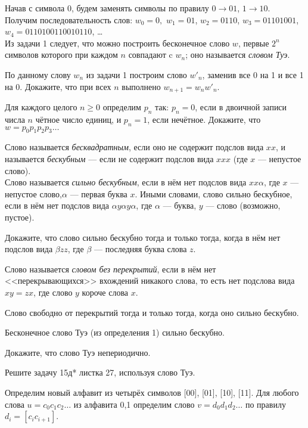 \documentclass[a4paper,12pt]{article}
\begin{document}


Начав с символа 0, будем заменять символы по правилу $0\rightarrow 01$,
$1\rightarrow10$. Получим последовательность слов:
$w_0=0,$ $w_1=01$, $w_2=0110$, $w_3=01101001$, $w_4=0110100110010110$, \ldots\\
Из задачи 1 следует, что можно построить бесконечное слово $w$, первые $2^n$ символов которого при каждом $n$ совпадают c $w_n$; оно называется {\em словом Туэ}.

По данному слову $w_n$ из задачи 1 построим слово $w'_n$, заменив все 0 на 1 и все 1 на 0.
Докажите, что при всех $n$ выполнено $w_{n+1}=w_nw'_{n}$.

Для каждого целого $n\geq0$ определим $p_n$ так: $p_n=0$, если в двоичной записи числа $n$ чётное число единиц, и $p_n=1$, если нечётное. Докажите, что $w=p_0p_1p_2p_3\ldots$

Слово называется {\em бесквадратным}, если оно не содержит подслов вида $xx$,
и называется {\em бескубным} --- если не содержит подслов вида $xxx$ (где $x$ --- непустое слово).\\ Слово называется {\em сильно бескубным}, если в нём нет подслов вида $xx\alpha$, где $x$ --- непустое слово,\break $\alpha$ --- первая буква $x$. Иными словами, слово сильно бескубное, если в нём нет подслов вида $\alpha y\alpha y\alpha$, где $\alpha$ --- буква,
$y$ --- слово (возможно, пустое).

Докажите, что слово сильно бескубно тогда и только тогда, когда в нём нет подслов вида $\beta z z$, где $\beta$ --- последняя буква слова $z$.

Слово называется {\em словом без перекрытий}, если в нём нет <<перекрывающихся>> вхождений никакого слова, то есть нет подслова вида $xy=zx$, где слово $y$ короче слова $x$.

Слово свободно от перекрытий тогда и только тогда, когда оно сильно бескубно.

 Бесконечное слово Туэ (из определения 1) сильно бескубно.

Докажите, что слово Туэ непериодично.

Решите задачу 15д* листка 27, используя слово Туэ.


Определим новый алфавит из четырёх символов [00], [01], [10], [11]. Для любого слова $u=c_0c_1c_2\ldots$ из алфавита {0,1} определим слово $v=d_0d_1d_2\ldots$ по правилу $d_i=[c_ic_{i+1}]$.
\end{document}
